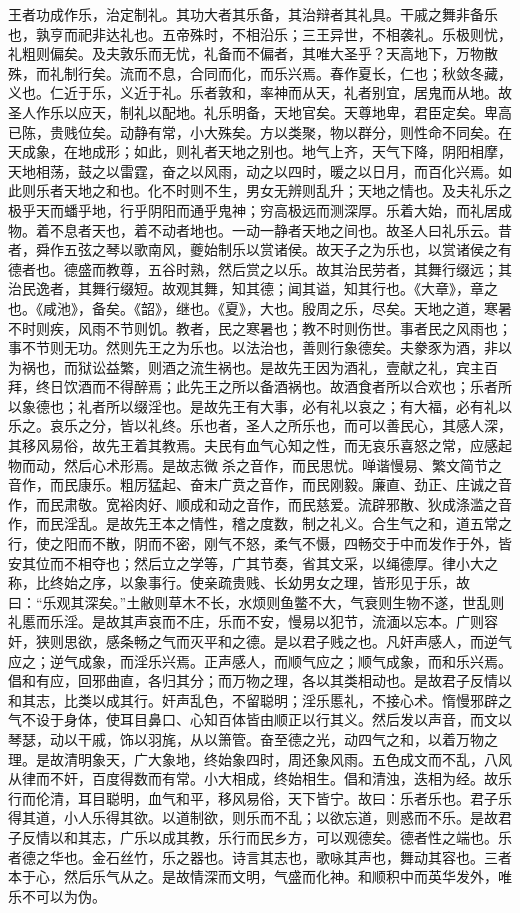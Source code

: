 \documentclass[]{article}
\begin{document}
王者功成作乐，治定制礼。其功大者其乐备，其治辩者其礼具。干戚之舞非备乐也，孰亨而祀非达礼也。五帝殊时，不相沿乐；三王异世，不相袭礼。乐极则忧，礼粗则偏矣。及夫敦乐而无忧，礼备而不偏者，其唯大圣乎？天高地下，万物散殊，而礼制行矣。流而不息，合同而化，而乐兴焉。春作夏长，仁也；秋敛冬藏，义也。仁近于乐，义近于礼。乐者敦和，率神而从天，礼者别宜，居鬼而从地。故圣人作乐以应天，制礼以配地。礼乐明备，天地官矣。天尊地卑，君臣定矣。卑高已陈，贵贱位矣。动静有常，小大殊矣。方以类聚，物以群分，则性命不同矣。在天成象，在地成形；如此，则礼者天地之别也。地气上齐，天气下降，阴阳相摩，天地相荡，鼓之以雷霆，奋之以风雨，动之以四时，暖之以日月，而百化兴焉。如此则乐者天地之和也。化不时则不生，男女无辨则乱升；天地之情也。及夫礼乐之极乎天而蟠乎地，行乎阴阳而通乎鬼神；穷高极远而测深厚。乐着大始，而礼居成物。着不息者天也，着不动者地也。一动一静者天地之间也。故圣人曰礼乐云。昔者，舜作五弦之琴以歌南风，夔始制乐以赏诸侯。故天子之为乐也，以赏诸侯之有德者也。德盛而教尊，五谷时熟，然后赏之以乐。故其治民劳者，其舞行缀远；其治民逸者，其舞行缀短。故观其舞，知其德；闻其谥，知其行也。《大章》，章之也。《咸池》，备矣。《韶》，继也。《夏》，大也。殷周之乐，尽矣。天地之道，寒暑不时则疾，风雨不节则饥。教者，民之寒暑也；教不时则伤世。事者民之风雨也；事不节则无功。然则先王之为乐也。以法治也，善则行象德矣。夫豢豕为酒，非以为祸也，而狱讼益繁，则酒之流生祸也。是故先王因为酒礼，壹献之礼，宾主百拜，终日饮酒而不得醉焉；此先王之所以备酒祸也。故酒食者所以合欢也；乐者所以象德也；礼者所以缀淫也。是故先王有大事，必有礼以哀之；有大福，必有礼以乐之。哀乐之分，皆以礼终。乐也者，圣人之所乐也，而可以善民心，其感人深，其移风易俗，故先王着其教焉。夫民有血气心知之性，而无哀乐喜怒之常，应感起物而动，然后心术形焉。是故志微杀之音作，而民思忧。啴谐慢易、繁文简节之音作，而民康乐。粗厉猛起、奋末广贲之音作，而民刚毅。廉直、劲正、庄诚之音作，而民肃敬。宽裕肉好、顺成和动之音作，而民慈爱。流辟邪散、狄成涤滥之音作，而民淫乱。是故先王本之情性，稽之度数，制之礼义。合生气之和，道五常之行，使之阳而不散，阴而不密，刚气不怒，柔气不慑，四畅交于中而发作于外，皆安其位而不相夺也；然后立之学等，广其节奏，省其文采，以绳德厚。律小大之称，比终始之序，以象事行。使亲疏贵贱、长幼男女之理，皆形见于乐，故曰：``乐观其深矣。''土敝则草木不长，水烦则鱼鳖不大，气衰则生物不遂，世乱则礼慝而乐淫。是故其声哀而不庄，乐而不安，慢易以犯节，流湎以忘本。广则容奸，狭则思欲，感条畅之气而灭平和之德。是以君子贱之也。凡奸声感人，而逆气应之；逆气成象，而淫乐兴焉。正声感人，而顺气应之；顺气成象，而和乐兴焉。倡和有应，回邪曲直，各归其分；而万物之理，各以其类相动也。是故君子反情以和其志，比类以成其行。奸声乱色，不留聪明；淫乐慝礼，不接心术。惰慢邪辟之气不设于身体，使耳目鼻口、心知百体皆由顺正以行其义。然后发以声音，而文以琴瑟，动以干戚，饰以羽旄，从以箫管。奋至德之光，动四气之和，以着万物之理。是故清明象天，广大象地，终始象四时，周还象风雨。五色成文而不乱，八风从律而不奸，百度得数而有常。小大相成，终始相生。倡和清浊，迭相为经。故乐行而伦清，耳目聪明，血气和平，移风易俗，天下皆宁。故曰：乐者乐也。君子乐得其道，小人乐得其欲。以道制欲，则乐而不乱；以欲忘道，则惑而不乐。是故君子反情以和其志，广乐以成其教，乐行而民乡方，可以观德矣。德者性之端也。乐者德之华也。金石丝竹，乐之器也。诗言其志也，歌咏其声也，舞动其容也。三者本于心，然后乐气从之。是故情深而文明，气盛而化神。和顺积中而英华发外，唯乐不可以为伪。
\end{document}
